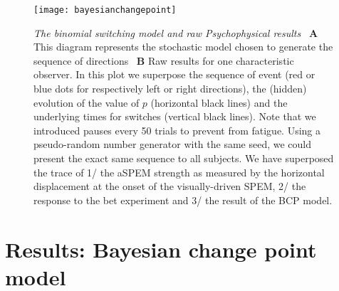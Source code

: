 \documentclass[profile,final,english, draft]{article}%
\begin{document}
\begin{figure}%
\begin{center} 
    \texttt{[image: bayesianchangepoint]}
\end{center}
\caption{\emph{The binomial switching model and raw Psychophysical results}%
~\textbf{A} This diagram represents the stochastic model chosen to generate the sequence of directions %
~\textbf{B} Raw results for one characteristic observer. In this plot we superpose the sequence of event (red or blue dots for respectively left or right directions), the (hidden) evolution of the value of $p$ (horizontal black lines) and the underlying times for switches (vertical black lines). Note that we introduced pauses every 50 trials to prevent from fatigue. Using a pseudo-random number generator with the same seed, we could present the exact same sequence to all subjects. %
We have superposed the trace of 1/ the aSPEM strength as measured by the horizontal displacement at the onset of the visually-driven SPEM, 2/ the response to the bet experiment and 3/ the result of the BCP model. 
}
\label{fig:results_raw}
\end{figure}
%
\section{Results: Bayesian change point model}

\end{document}
